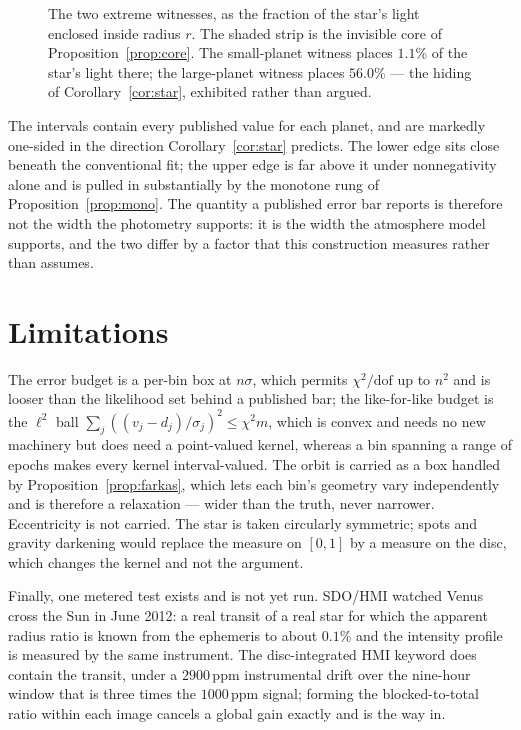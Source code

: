 \documentclass[11pt]{article}
\begin{document}
\begin{figure}[t]\centering\figProfiles
\caption{The two extreme witnesses, as the fraction of the star's light enclosed
inside radius $r$. The shaded strip is the invisible core of
Proposition~\ref{prop:core}. The small-planet witness places $1.1\%$ of the
star's light there; the large-planet witness places $56.0\%$ --- the hiding of
Corollary~\ref{cor:star}, exhibited rather than argued.}\end{figure}

The intervals contain every published value for each planet, and are markedly
one-sided in the direction Corollary~\ref{cor:star} predicts. The lower edge sits
close beneath the conventional fit; the upper edge is far above it under
nonnegativity alone and is pulled in substantially by the monotone rung of
Proposition~\ref{prop:mono}. The quantity a published error bar reports is
therefore not the width the photometry supports: it is the width the atmosphere
model supports, and the two differ by a factor that this construction measures
rather than assumes.

\section{Limitations}

The error budget is a per-bin box at $n\sigma$, which permits
$\chi^2/\mathrm{dof}$ up to $n^2$ and is looser than the likelihood set behind a
published bar; the like-for-like budget is the $\ell^2$ ball
$\sum_j((v_j-d_j)/\sigma_j)^2\le \chi^2 m$, which is convex and needs no new
machinery but does need a point-valued kernel, whereas a bin spanning a range of
epochs makes every kernel interval-valued. The orbit is carried as a box handled
by Proposition~\ref{prop:farkas}, which lets each bin's geometry vary
independently and is therefore a relaxation --- wider than the truth, never
narrower. Eccentricity is not carried. The star is taken circularly symmetric;
spots and gravity darkening would replace the measure on $[0,1]$ by a measure on
the disc, which changes the kernel and not the argument.

Finally, one metered test exists and is not yet run. SDO/HMI watched Venus cross
the Sun in June 2012: a real transit of a real star for which the apparent radius
ratio is known from the ephemeris to about $0.1\%$ and the intensity profile is
measured by the same instrument. The disc-integrated HMI keyword does contain the
transit, under a $2900$\,ppm instrumental drift over the nine-hour window that is
three times the $1000$\,ppm signal; forming the blocked-to-total ratio within
each image cancels a global gain exactly and is the way in.
\end{document}
